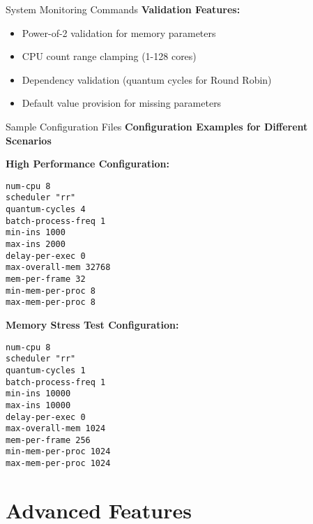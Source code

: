 \documentclass[10pt]{beamer}
\begin{document}
\begin{frame}[fragile]{System Monitoring Commands}
    \vspace{0.3cm}
    \textbf{Validation Features:}
    \begin{itemize}
        \item Power-of-2 validation for memory parameters
        \item CPU count range clamping (1-128 cores)
        \item Dependency validation (quantum cycles for Round Robin)
        \item Default value provision for missing parameters
    \end{itemize}
\end{frame}

\begin{frame}[fragile]{Sample Configuration Files}
    \textbf{Configuration Examples for Different Scenarios}
    
    \textbf{High Performance Configuration:}
    \begin{lstlisting}[basicstyle=\ttfamily\tiny]
num-cpu 8
scheduler "rr"
quantum-cycles 4
batch-process-freq 1
min-ins 1000
max-ins 2000
delay-per-exec 0
max-overall-mem 32768
mem-per-frame 32
min-mem-per-proc 8
max-mem-per-proc 8
    \end{lstlisting}
    
    \textbf{Memory Stress Test Configuration:}
    \begin{lstlisting}[basicstyle=\ttfamily\tiny]
num-cpu 8
scheduler "rr"
quantum-cycles 1
batch-process-freq 1
min-ins 10000
max-ins 10000
delay-per-exec 0
max-overall-mem 1024
mem-per-frame 256
min-mem-per-proc 1024
max-mem-per-proc 1024
    \end{lstlisting}
\end{frame}

\section{Advanced Features}
\end{document}
